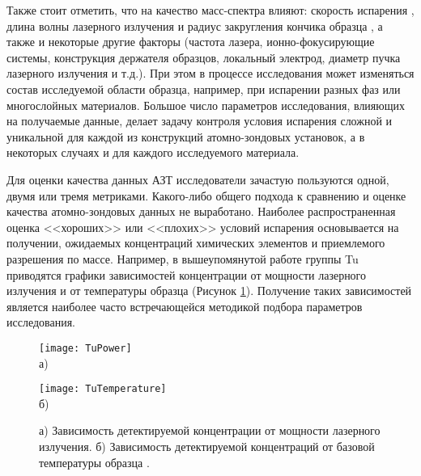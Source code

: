 Также стоит отметить, что на качество масс-спектра влияют: скорость испарения \cite{Raznitsyn18}, длина волны лазерного излучения и радиус закругления кончика образца \cite{Houard10}, а также и некоторые другие факторы (частота лазера, ионно-фокусирующие системы, конструкция держателя образцов, локальный электрод, диаметр пучка лазерного излучения и т.д.). При этом в процессе исследования может изменяться состав исследуемой области образца, например, при испарении разных фаз или многослойных материалов. Большое число параметров исследования, влияющих на получаемые данные, делает задачу контроля условия испарения сложной и уникальной для каждой из конструкций атомно-зондовых установок, а в некоторых случаях и для каждого исследуемого материала. 

Для оценки качества данных АЗТ исследователи зачастую пользуются одной, двумя или тремя метриками. Какого-либо общего подхода к сравнению  и оценке качества атомно-зондовых данных не выработано. Наиболее распространенная оценка <<хороших>> или <<плохих>> условий испарения основывается на получении, ожидаемых концентраций химических элементов и приемлемого разрешения по массе. Например, в вышеупомянутой работе группы Tu \cite{Tu15} приводятся графики зависимостей концентрации от мощности лазерного излучения и от температуры образца (Рисунок \cref{fig:TuComposition}). Получение таких зависимостей является наиболее часто встречающейся методикой подбора параметров исследования. 

\begin{figure}[htb]
	\begin{minipage}[b]{0.49\textwidth}\centering
		\texttt{[image: TuPower]} \\ а)
	\end{minipage}
	\begin{minipage}[b]{0.49\textwidth}\centering
		\texttt{[image: TuTemperature]} \\ б)
	\end{minipage}
	\caption{а) Зависимость детектируемой концентрации от мощности лазерного излучения. б) Зависимость детектируемой концентраций от базовой температуры образца \cite{Tu15}.}
	\label{fig:TuComposition}
\end{figure}

